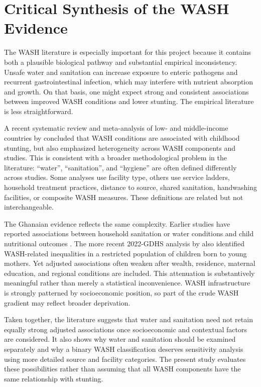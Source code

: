 \section{Critical Synthesis of the WASH Evidence}

The WASH literature is especially important for this project because it contains both a plausible biological pathway and substantial empirical inconsistency. Unsafe water and sanitation can increase exposure to enteric pathogens and recurrent gastrointestinal infection, which may interfere with nutrient absorption and growth. On that basis, one might expect strong and consistent associations between improved WASH conditions and lower stunting. The empirical literature is less straightforward.

A recent systematic review and meta-analysis of low- and middle-income countries by \citet{WijayantoEtAl2026} concluded that WASH conditions are associated with childhood stunting, but also emphasized heterogeneity across WASH components and studies. This is consistent with a broader methodological problem in the literature: ``water'', ``sanitation'', and ``hygiene'' are often defined differently across studies. Some analyses use facility type, others use service ladders, household treatment practices, distance to source, shared sanitation, handwashing facilities, or composite WASH measures. These definitions are related but not interchangeable.

The Ghanaian evidence reflects the same complexity. Earlier studies have reported associations between household sanitation or water conditions and child nutritional outcomes \cite{AhetoEtAl2015,BoahEtAl2019}. The more recent 2022-GDHS analysis by \citet{OgumEtAl2026} also identified WASH-related inequalities in a restricted population of children born to young mothers. Yet adjusted associations often weaken after wealth, residence, maternal education, and regional conditions are included. This attenuation is substantively meaningful rather than merely a statistical inconvenience. WASH infrastructure is strongly patterned by socioeconomic position, so part of the crude WASH gradient may reflect broader deprivation.

Taken together, the literature suggests that water and sanitation need not retain equally strong adjusted associations once socioeconomic and contextual factors are considered. It also shows why water and sanitation should be examined separately and why a binary WASH classification deserves sensitivity analysis using more detailed source and facility categories. The present study evaluates these possibilities rather than assuming that all WASH components have the same relationship with stunting.

